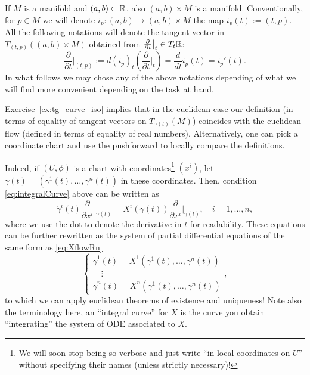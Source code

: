 \begin{notation}
  If $M$ is a manifold and $(a,b)\subset\mathbb{R}$, also $(a,b)\times M$ is a manifold. 
  Conventionally, for $p\in M$ we will denote $i_p : (a,b) \to (a,b)\times M$ the map $i_p(t) := (t,p)$.
  All the following notations will denote the tangent vector in $T_{(t,p)}((a,b)\times M)$ obtained from $\frac{\partial}{\partial t}\big|_t \in T_t\mathbb{R}$:
  \begin{equation}
    \frac{\partial}{\partial t}\Big|_{(t,p)} := d (i_p)_t\left(\frac{\partial}{\partial t}\Big|_t\right) = \frac{d}{d t}  i_p(t) = i_p'(t).
  \end{equation}
  In what follows we may chose any of the above notations depending of what we will find more convenient depending on the task at hand.
\end{notation}

Exercise~\ref{ex:tg_curve_iso} implies that in the euclidean case our definition (in terms of equality of tangent vectors on $T_{\gamma(t)}(M)$) coincides with the euclidean flow (defined in terms of equality of real numbers).
Alternatively, one can pick a coordinate chart and use the pushforward to locally compare the definitions.

Indeed, if $(U, \phi)$ is a chart with coordinates\footnote{We will soon stop being so verbose and just write ``in local coordinates on $U$'' without specifying their names (unless strictly necessary)!} $(x^i)$, let $\gamma(t) = (\gamma^1(t), \ldots, \gamma^n(t))$ in these coordinates. Then, condition \eqref{eq:integralCurve} above can be written as
\begin{equation}
  \dot\gamma^i(t)\frac{\partial}{\partial x^i}\Big|_{\gamma(t)}
  = X^i(\gamma(t))\frac{\partial}{\partial x^i}\Big|_{\gamma(t)},\quad i=1,\ldots,n,
\end{equation}
where we use the dot to denote the derivative in $t$ for readability.
These equations can be further rewritten as the system of partial differential equations of the same form as \eqref{eq:XflowRn}
\begin{equation}
  \begin{cases}
    \dot\gamma^1(t) = X^1(\gamma^1(t), \ldots, \gamma^n(t)) \\
    \quad \vdots \\
    \dot\gamma^n(t) = X^n(\gamma^1(t), \ldots, \gamma^n(t))
  \end{cases},
\end{equation}
to which we can apply euclidean theorems of existence and uniqueness!
Note also the terminology here, an ``integral curve'' for $X$ is the curve you obtain ``integrating'' the system of ODE associated to $X$.

